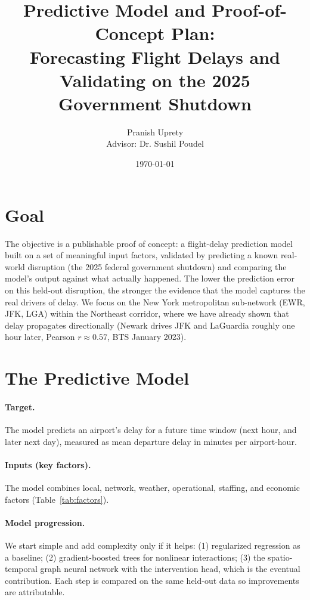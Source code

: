 \documentclass[11pt]{article}
\title{Predictive Model and Proof-of-Concept Plan:\\
Forecasting Flight Delays and Validating on the 2025 Government Shutdown}
\author{Pranish Uprety \\ Advisor: Dr. Sushil Poudel}
\date{\today}
\begin{document}
\maketitle

\section{Goal}
The objective is a publishable proof of concept: a flight-delay prediction model
built on a set of meaningful input factors, validated by predicting a known
real-world disruption (the 2025 federal government shutdown) and comparing the
model's output against what actually happened. The lower the prediction error on
this held-out disruption, the stronger the evidence that the model captures the
real drivers of delay. We focus on the New York metropolitan sub-network
(EWR, JFK, LGA) within the Northeast corridor, where we have already shown that
delay propagates directionally (Newark drives JFK and LaGuardia roughly one hour
later, Pearson $r \approx 0.57$, BTS January 2023).

\section{The Predictive Model}
\paragraph{Target.} The model predicts an airport's delay for a future time
window (next hour, and later next day), measured as mean departure delay in
minutes per airport-hour.

\paragraph{Inputs (key factors).} The model combines local, network, weather,
operational, staffing, and economic factors (Table~\ref{tab:factors}).

\paragraph{Model progression.} We start simple and add complexity only if it
helps: (1) regularized regression as a baseline; (2) gradient-boosted trees for
nonlinear interactions; (3) the spatio-temporal graph neural network with the
intervention head, which is the eventual contribution. Each step is compared on
the same held-out data so improvements are attributable.
\end{document}
